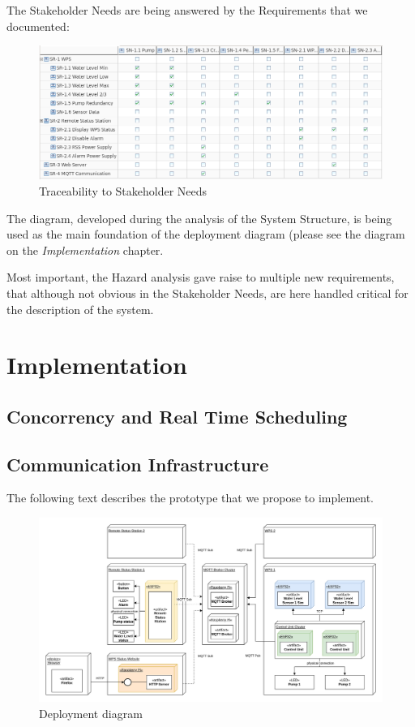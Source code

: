 \documentclass[11pt]{article}
\begin{document}
The Stakeholder Needs are being answered by the Requirements that we documented:

\begin{figure}[H]
  \centering
  \includegraphics[width=\linewidth]{../diagrams/traceability.png}
  \caption{Traceability to Stakeholder Needs}
  \label{fig:Traceability}
\end{figure}

The diagram, developed during the analysis of the System Structure, is being used as the main foundation of the deployment diagram (please see the diagram on the \textit{Implementation} chapter.

Most important, the Hazard analysis gave raise to multiple new requirements, that although not obvious in the Stakeholder Needs, are here handled critical for the description of the system.

\newpage
\section{Implementation}

\subsection{Concorrency and Real Time Scheduling}

\subsection{Communication Infrastructure}

The following text describes the prototype that we propose to implement. 

\begin{figure}[H]
  \centering
  \includegraphics[width=\linewidth]{../diagrams/deployment-diagram-WPS.jpg}
  \caption{Deployment diagram}
  \label{fig:Deployment Diagram}
\end{figure}
\end{document}
